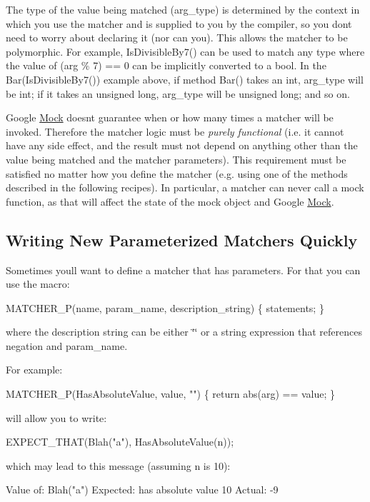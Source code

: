 \begin{DoxyEnumerate}
\item The type of the value being matched ({\ttfamily arg\+\_\+type}) is determined by the context in which you use the matcher and is supplied to you by the compiler, so you don\textquotesingle{}t need to worry about declaring it (nor can you). This allows the matcher to be polymorphic. For example, {\ttfamily Is\+Divisible\+By7()} can be used to match any type where the value of {\ttfamily (arg \% 7) == 0} can be implicitly converted to a {\ttfamily bool}. In the {\ttfamily Bar(\+Is\+Divisible\+By7())} example above, if method {\ttfamily Bar()} takes an {\ttfamily int}, {\ttfamily arg\+\_\+type} will be {\ttfamily int}; if it takes an {\ttfamily unsigned long}, {\ttfamily arg\+\_\+type} will be {\ttfamily unsigned long}; and so on.
\end{DoxyEnumerate}
\begin{DoxyEnumerate}
\item Google \hyperlink{classMock}{Mock} doesn\textquotesingle{}t guarantee when or how many times a matcher will be invoked. Therefore the matcher logic must be {\itshape purely functional} (i.\+e. it cannot have any side effect, and the result must not depend on anything other than the value being matched and the matcher parameters). This requirement must be satisfied no matter how you define the matcher (e.\+g. using one of the methods described in the following recipes). In particular, a matcher can never call a mock function, as that will affect the state of the mock object and Google \hyperlink{classMock}{Mock}.
\end{DoxyEnumerate}

\subsection*{Writing New Parameterized Matchers Quickly}

Sometimes you\textquotesingle{}ll want to define a matcher that has parameters. For that you can use the macro\+: 
\begin{DoxyCode}
MATCHER\_P(name, param\_name, description\_string) \{ statements; \}
\end{DoxyCode}
 where the description string can be either {\ttfamily \char`\"{}\char`\"{}} or a string expression that references {\ttfamily negation} and {\ttfamily param\+\_\+name}.

For example\+: 
\begin{DoxyCode}
MATCHER\_P(HasAbsoluteValue, value, \textcolor{stringliteral}{""}) \{ \textcolor{keywordflow}{return} abs(arg) == value; \}
\end{DoxyCode}
 will allow you to write\+: 
\begin{DoxyCode}
EXPECT\_THAT(Blah(\textcolor{stringliteral}{"a"}), HasAbsoluteValue(n));
\end{DoxyCode}
 which may lead to this message (assuming {\ttfamily n} is 10)\+: 
\begin{DoxyCode}
Value of: Blah("a")
Expected: has absolute value 10
  Actual: -9
\end{DoxyCode}


